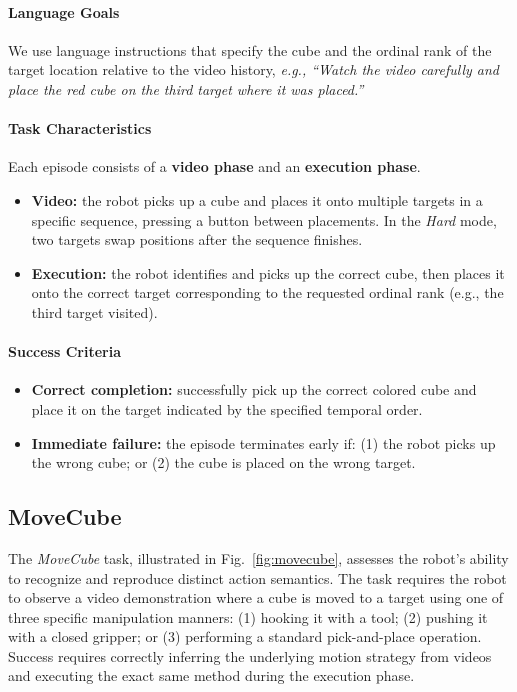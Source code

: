 \paragraph{Language Goals}
We use language instructions that specify the cube and the ordinal rank of the target location relative to the video history, \textit{e.g., ``Watch the video carefully and place the red cube on the third target where it was placed.''}

\paragraph{Task Characteristics}
Each episode consists of a \textbf{video phase} and an \textbf{execution phase}.
\begin{itemize}[itemsep=1pt, topsep=0pt, leftmargin=*]
\item \textbf{Video:} the robot picks up a cube and places it onto multiple targets in a specific sequence, pressing a button between placements. In the \textit{Hard} mode, two targets swap positions after the sequence finishes.
\item \textbf{Execution:} the robot identifies and picks up the correct cube, then places it onto the correct target corresponding to the requested ordinal rank (e.g., the third target visited).
\end{itemize}

\paragraph{Success Criteria}
\begin{itemize}[itemsep=1pt, topsep=0pt, leftmargin=*]
\item \textbf{Correct completion:} successfully pick up the correct colored cube and place it on the target indicated by the specified temporal order.
\item \textbf{Immediate failure:} the episode terminates early if: (1) the robot picks up the wrong cube; or (2) the cube is placed on the wrong target.
\end{itemize}

\clearpage



\subsection{MoveCube}
\label{sec:task_movecube}

The \textit{MoveCube} task, illustrated in Fig.~\ref{fig:movecube}, assesses the robot's ability to recognize and reproduce distinct action semantics. The task requires the robot to observe a video demonstration where a cube is moved to a target using one of three specific manipulation manners: (1) hooking it with a tool; (2) pushing it with a closed gripper; or (3) performing a standard pick-and-place operation. Success requires correctly inferring the underlying motion strategy from videos and executing the exact same method during the execution phase.

